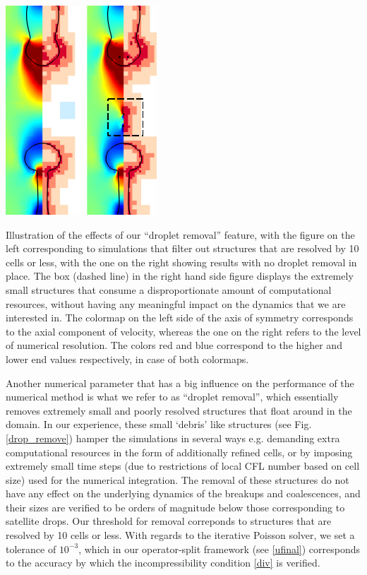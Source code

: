 \begin{marginfigure}[-6cm]
\centering
\includegraphics{plots/ligament_breakup/drop_removal.pdf}
	\caption{Illustration of the effects of our ``droplet removal'' feature, 
	with the figure on the left corresponding to simulations that filter out
	structures that are resolved by 10 cells or less, with the one on the right
	showing results with no droplet removal in place. The box (dashed line) in the 
	right hand side figure displays the extremely small structures that consume 
	a disproportionate amount of computational resources, without having any meaningful
	impact on the dynamics that we are interested in. The colormap on the left side of the axis of 
	symmetry corresponds to the axial component of velocity, whereas the one on the right refers
	to the level of numerical resolution. The colors red and blue correspond to the higher 
	and lower end values respectively, in case of both colormaps. 
	}
\label{drop_remove}
\end{marginfigure}

Another numerical parameter that has a big influence on the performance of 
the numerical method is what we refer to as ``droplet removal'', 
which essentially removes extremely small and poorly 
resolved structures that float around in the domain. 
In our experience, these small `debris' like structures (see Fig. \ref{drop_remove})
hamper the simulations in several ways e.g. demanding extra computational 
resources in the form of additionally refined cells, 
or by imposing extremely small time steps (due to restrictions of 
local CFL number based on cell size) used for the numerical integration. 
The removal of these structures do not have any effect on the 
underlying dynamics of the breakups and coalescences, and their sizes 
are verified to be orders of magnitude below those corresponding to satellite drops. 
Our threshold for removal correponds to structures that are resolved by 10 cells or less. 
With regards to the iterative Poisson solver, we set a tolerance of $10^{-3}$, which in our
operator-split framework (see \eqref{ufinal}) corresponds to the 
accuracy by which the incompressibility condition \eqref{div} is verified. 

